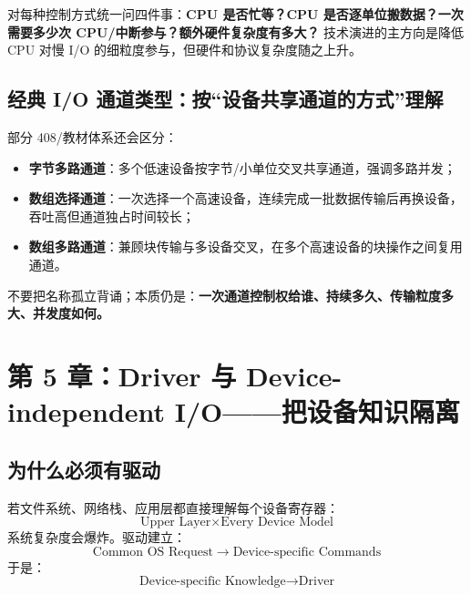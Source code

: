 \documentclass[UTF8,fontset=fandol,11pt,a4paper]{ctexart}
\newcommand{\kw}[1]{\textbf{#1}}
\newcommand{\arr}{\;\longrightarrow\;}
\begin{document}
\begin{exam}
对每种控制方式统一问四件事：\kw{CPU 是否忙等？CPU 是否逐单位搬数据？一次需要多少次 CPU/中断参与？额外硬件复杂度有多大？} 技术演进的主方向是降低 CPU 对慢 I/O 的细粒度参与，但硬件和协议复杂度随之上升。
\end{exam}

\subsection{经典 I/O 通道类型：按“设备共享通道的方式”理解}
部分 408/教材体系还会区分：
\begin{itemize}
  \item \kw{字节多路通道}：多个低速设备按字节/小单位交叉共享通道，强调多路并发；
  \item \kw{数组选择通道}：一次选择一个高速设备，连续完成一批数据传输后再换设备，吞吐高但通道独占时间较长；
  \item \kw{数组多路通道}：兼顾块传输与多设备交叉，在多个高速设备的块操作之间复用通道。
\end{itemize}
不要把名称孤立背诵；本质仍是：\kw{一次通道控制权给谁、持续多久、传输粒度多大、并发度如何。}

\section{第 5 章：Driver 与 Device-independent I/O——把设备知识隔离}

\subsection{为什么必须有驱动}
若文件系统、网络栈、应用层都直接理解每个设备寄存器：
\[
\text{Upper Layer}\times\text{Every Device Model}
\]
系统复杂度会爆炸。驱动建立：
\[
\boxed{\text{Common OS Request}\arr\text{Device-specific Commands}}
\]
于是：
\[
\boxed{\text{Device-specific Knowledge}\to\text{Driver}}
\]
\end{document}
